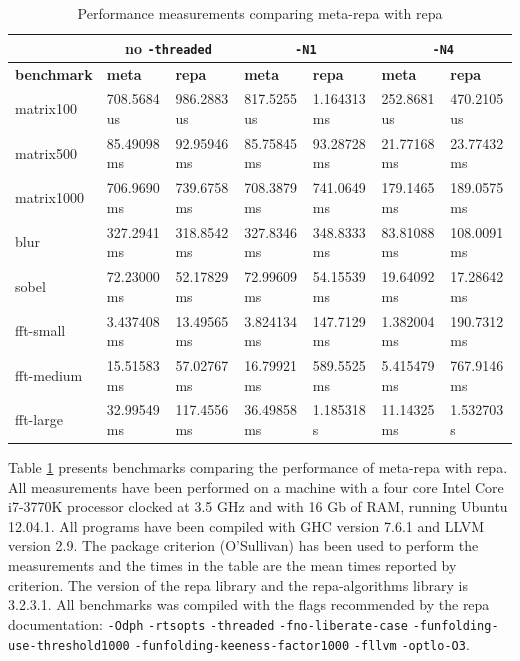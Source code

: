 \documentclass[preprint]{sigplanconf}
\begin{document}
\begin{table}[t]
\center
\begin{tabular}{|l||l|l||l|l||l|l|}
\hline
 & \multicolumn{2}{c||}{no \tt -threaded} & \multicolumn{2}{c||}{\tt -N1} & \multicolumn{2}{c|}{\tt -N4}\\
\hline
\bf benchmark & \bf meta  & \bf repa  & \bf meta  & \bf repa  & \bf meta  & \bf repa \\
\hline
\hline
matrix100 & 708.5684 us & 986.2883 us & 817.5255 us & 1.164313 ms & 252.8681 us & 470.2105 us \\
\hline
matrix500 & 85.49098 ms & 92.95946 ms &  85.75845 ms &  93.28728 ms & 21.77168 ms & 23.77432 ms \\
\hline
matrix1000 & 706.9690 ms & 739.6758 ms & 708.3879 ms & 741.0649 ms & 179.1465 ms & 189.0575 ms \\
\hline
blur & 327.2941 ms & 318.8542 ms & 327.8346 ms & 348.8333 ms & 83.81088 ms & 108.0091 ms \\
\hline
sobel & 72.23000 ms & 52.17829 ms & 72.99609 ms & 54.15539 ms & 19.64092 ms & 17.28642 ms \\
\hline
fft-small & 3.437408 ms & 13.49565 ms &  3.824134 ms & 147.7129 ms & 1.382004 ms & 190.7312 ms \\
\hline
fft-medium & 15.51583 ms & 57.02767 ms & 16.79921 ms & 589.5525 ms & 5.415479 ms & 767.9146 ms \\
\hline
fft-large & 32.99549 ms & 117.4556 ms & 36.49858 ms & 1.185318 s & 11.14325 ms & 1.532703 s \\
\hline
\end{tabular}
\caption{Performance measurements comparing meta-repa with repa}
\label{tab:benchmarks}
\end{table}

Table \ref{tab:benchmarks} presents benchmarks comparing the performance
of meta-repa with repa. All measurements have been performed on a
machine with a four core Intel Core i7-3770K processor clocked at 3.5
GHz and with 16 Gb of RAM, running Ubuntu 12.04.1. All programs have
been compiled with GHC version 7.6.1 and LLVM version 2.9. The package
criterion (O'Sullivan) has been used to perform the measurements and the
times in the table are the mean times reported by criterion. The version
of the repa library and the repa-algorithms library is 3.2.3.1. All
benchmarks was compiled with the flags recommended by the repa
documentation: \texttt{-Odph} \texttt{-rtsopts} \texttt{-threaded}
\texttt{-fno-liberate-case}
\newline \texttt{-funfolding-use-threshold1000} \newline
\texttt{-funfolding-keeness-factor1000} \texttt{-fllvm}
\texttt{-optlo-O3}.
\end{document}
